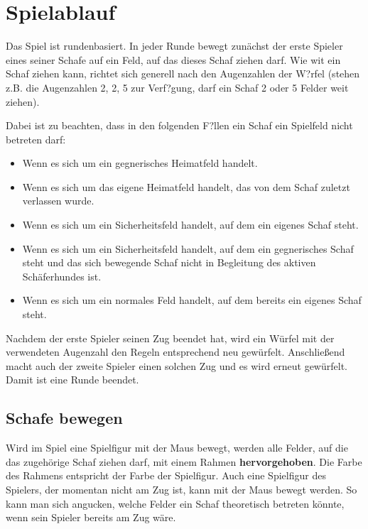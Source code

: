 \documentclass[11pt,pointlessnumbers,DIV10,BCOR10mm,tocleft]{scrreprt}
\begin{document}
\section{Spielablauf}
Das Spiel ist rundenbasiert. In jeder Runde bewegt zunächst der erste Spieler eines seiner Schafe auf ein Feld, auf das dieses Schaf ziehen darf. Wie wit ein Schaf ziehen kann, richtet sich generell nach den Augenzahlen der W?rfel (stehen z.B. die Augenzahlen 2, 2, 5 zur Verf?gung, darf ein Schaf 2 oder 5 Felder weit ziehen). 

Dabei ist zu beachten, dass in den folgenden F?llen ein Schaf ein Spielfeld nicht betreten darf:

\begin{itemize}
\item Wenn es sich um ein gegnerisches Heimatfeld handelt.
\item Wenn es sich um das eigene Heimatfeld handelt, das von dem Schaf zuletzt verlassen wurde.

\item Wenn es sich um ein Sicherheitsfeld handelt, auf dem ein eigenes Schaf steht.
\item Wenn es sich um ein Sicherheitsfeld handelt, auf dem ein gegnerisches Schaf steht und das sich bewegende Schaf nicht in Begleitung des aktiven Schäfer\-hundes ist.

\item Wenn es sich um ein normales Feld handelt, auf dem bereits ein eigenes Schaf steht.
\end{itemize}

Nachdem der erste Spieler seinen Zug beendet hat, wird ein Würfel mit der verwendeten Augenzahl den Regeln entsprechend neu gewürfelt. Anschließend macht auch der zweite Spieler einen solchen Zug und es wird erneut gewürfelt. Damit ist eine Runde beendet.

\subsection{Schafe bewegen}

Wird im Spiel eine Spielfigur mit der Maus bewegt, werden alle Felder, auf die das zugehörige Schaf ziehen darf, mit einem Rahmen \textbf{hervorgehoben}. Die Farbe des Rahmens entspricht der Farbe der Spielfigur. Auch eine Spielfigur des Spielers, der momentan nicht am Zug ist, kann mit der Maus bewegt werden. So kann man sich angucken, welche Felder ein Schaf theoretisch betreten könnte, wenn sein Spieler bereits am Zug wäre.
\end{document}
